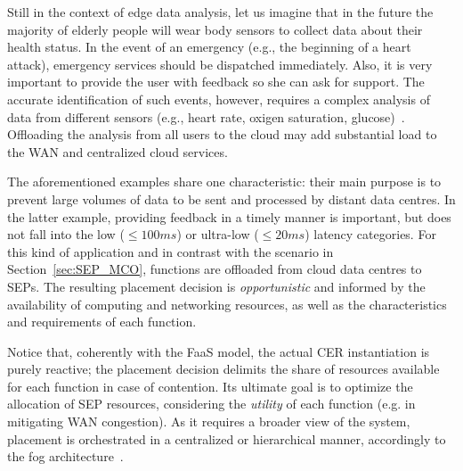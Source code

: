 Still in the context of edge data analysis, 
let us imagine that in the future the majority of elderly people will wear body sensors to collect data about their health status. In the event of an emergency (e.g., the beginning of a heart attack), emergency services should be dispatched immediately.
Also, it is very important to provide the user with feedback so she can ask for support.
The accurate identification of such events, however, requires a complex analysis of data from different sensors (e.g., heart rate, oxigen saturation, glucose)~\cite{Li:2017}. Offloading the analysis from all users to the cloud may add substantial load to the WAN and centralized cloud services. %


 


The aforementioned examples share one characteristic: their main purpose is to prevent large volumes of data to be sent and processed by distant data centres. In the latter example, providing feedback in a timely manner is important, but does not fall into the low ($\leq 100ms$) or ultra-low ($\leq 20ms$) latency categories. For this kind of application and in contrast with the scenario in Section~\ref{sec:SEP_MCO}, functions are offloaded from cloud data centres to SEPs. The resulting placement decision is \textit{opportunistic} and informed by the availability of computing and networking resources, as well as the characteristics and requirements of each function. 

Notice that, coherently with the FaaS model, the actual CER instantiation is purely reactive; the placement decision delimits the share of resources available for each function in case of contention.
Its ultimate goal is to optimize the allocation of SEP resources, considering the \textit{utility} of each function (e.g. in mitigating WAN congestion). As it requires a broader view of the system, placement is orchestrated in a centralized or hierarchical manner, accordingly to the fog architecture~\cite{Mach:2017}.  


